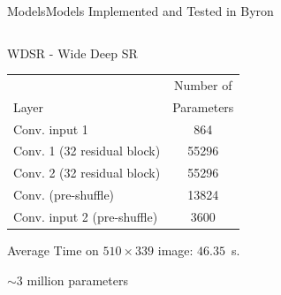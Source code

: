 \documentclass[10pt, unicode]{beamer}
\begin{document}
\begin{frame}{Models}{Models Implemented and Tested in Byron}
\begin{columns}
\begin{column}{0.5\textwidth}
      \begin{block}{WDSR - Wide Deep SR}
        \scriptsize{
        \begin{tabular}{lc}
          \hline \rowcolor{blue!20!white}
                                      & Number of    \\
          \rowcolor{blue!20!white}
          Layer                         & Parameters   \\
          \hline
          Conv. input 1                 & 864     \\
          Conv. 1 (32 residual block)   & 55296   \\
          Conv. 2 (32 residual block)   & 55296   \\
          Conv. (pre-shuffle)           & 13824   \\
          Conv. input 2 (pre-shuffle)   & 3600    \\
          \hline
        \end{tabular}
        }
        \scriptsize{Average Time on $510\times339$ image: $46.35$~s.}

        \scriptsize{$\sim3$ million parameters}
      \end{block}
    \end{column}
  \end{columns}

\end{frame}
\end{document}
